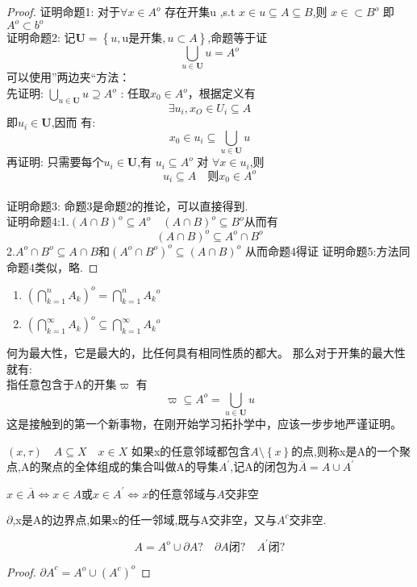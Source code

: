 \begin{proof}
    证明命题1: 对于\(\forall x\in A^{o}\) 存在开集u ,s.t \(x \in u \subseteq A \subseteq B\),则 \(x \in \subset B^{o}\)
    即\(A^{o} \subset b^{o}\) \\
    证明命题2: 记\(\mathbf{U}=\left\{u,\text{u是开集},u\subset A\right\}\),命题等于证 \[\bigcup_{u \in \mathbf{U}}u=A^{o}\]
    可以使用”两边夹“方法： \\
    先证明: \(\bigcup_{u \in \mathbf{U}}u \supseteq A^{o}\) : 任取\(x_0 \in A^{o}\)，根据定义有 \[\exists u_i , x_O \in U_i \subseteq A \]
    即\(u_i \in \mathbf{U}\),因而 有:\[x_0 \in u_i \subseteq \bigcup_{u \in \mathbf{U}}u\]
    再证明: 只需要每个\(u_i \in \mathbf{U}\),有 \(u_i \subseteq A^{o}\) 对 \(\forall x \in u_i\),则
    \[u_i \subseteq A \quad \text{则} x_0 \in A ^{o}\] \\
    证明命题3: 命题3是命题2的推论，可以直接得到. \\
    证明命题4:1.\({\left(A \cap B\right)}^{o}\subseteq A^{o} \quad {\left(A \cap B\right)}^{o}\subseteq B^{o}\)从而有 
    \[{\left(A \cap B\right)}^{o}\subseteq A^{o}\cap B^{o}\]
    2.\(A^{o}\cap B^{o} \subseteq A \cap B\)和\({\left(A^{o}\cap B^{o}\right)}^{o}\subseteq {\left(A\cap B\right)}^{o}\)
    从而命题4得证
    证明命题5:方法同命题4类似，略.
\end{proof}
\begin{note}[命题四]
    \begin{enumerate}
        \item \({\left(\bigcap_{k=1}^{n} A_k\right)}^{o}=\bigcap_{k=1}^{n}{A_k}^{o}\)\\
        \item \({\left(\bigcap_{k=1}^{\infty} A_k\right)}^{o} \subseteq \bigcap_{k=1}^{\infty}{A_k}^{o}\)
    \end{enumerate}
\end{note}
\begin{note}
    何为最大性，它是最大的，比任何具有相同性质的都大。 那么对于开集的最大性就有: \\
    指任意包含于A的开集\(\varpi\) 有
    \[\varpi \subseteq A^{o} =\bigcup_{u \in \mathbf{U}} u\]
    这是接触到的第一个新事物，在刚开始学习拓扑学中，应该一步步地严谨证明。
\end{note}
\begin{definition}
    \( \left(x,\tau\right) \quad A \subseteq X \quad x \in X\) 如果x的任意邻域都包含\(A \setminus \left\{x\right\}\)的点,则称x是A的一个聚点,A的聚点的全体组成的集合叫做A的导集\(A^{'}\),记A的闭包为\(\overline{A}=A \cup A^{'}\)
\end{definition}
\(x \in \overline{A} \Leftrightarrow x \in A 或 x\in A^{'} \Leftrightarrow x的任意邻域与A交非空\)
\begin{definition}[边界点]
    \(\partial\),x是A的边界点,如果x的任一邻域,既与A交非空，又与\(A^{c}\)交非空.
\end{definition}
\begin{exercise}
    \[A=A^{o}\cup \partial A ? \quad \partial A \text{闭}? \quad A^{'} \text{闭} ?\]
\end{exercise}
\begin{proof}
    \({\partial A }^c =A^o \cup {\left(A^c\right)}^o\)
\end{proof}
